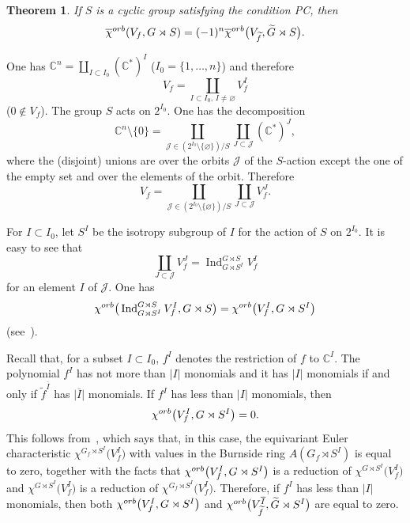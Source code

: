 \documentclass[11pt]{article}
\numberwithin{equation}{section}
\numberwithin{equation}{section}
\newtheorem{Theorem}{Theorem}[section]
\begin{document}
\begin{Theorem}\label{theo:Main} If $S$ is a cyclic group satisfying the condition PC, then
 \begin{gather}\label{eqn:Main}
 {\overline{\chi}}^{ \rm orb}(V_f,G \rtimes S)=(-1)^n {\overline{\chi}}^{ \rm orb}\big(V_{\widetilde{f}},\widetilde{G} \rtimes S\big) .
 \end{gather}
\end{Theorem}

One has ${\mathbb C}^n=\coprod_{I\subset I_0}({\mathbb C}^*)^I$ ($I_0=\{1,\dots, n\}$) and therefore
\[V_f=\coprod_{I\subset I_0,\, I\ne\varnothing} V_f^I
\]
($0\notin V_f$). The group $S$ acts on
$2^{I_0}$. One has the decomposition
\[
{\mathbb C}^n \setminus \{ 0 \} =\coprod_{{\mathcal J}\in\left(2^{I_0}\setminus\{\varnothing\}\right)/S}\coprod_{J\subset {\mathcal J}}({\mathbb C}^*)^J,
\]
where the (disjoint)
unions are over the orbits ${\mathcal J}$ of the $S$-action except the one of the empty set and over the elements of
the orbit. Therefore
\[
V_f=\coprod_{{\mathcal J}\in\left(2^{I_0}\setminus\{\varnothing\}\right)/S}\coprod_{J\subset {\mathcal J}}V_f^J.
\]

For $I\subset I_0$, let $S^I$ be the isotropy subgroup of $I$ for the action of $S$ on $2^{I_0}$. It is easy to see that
\[
\coprod_{J\subset {\mathcal J}}V_f^J=\operatorname{Ind}_{G\rtimes S^I}^{G\rtimes S} V_f^I
\]
for an element $I$ of ${\mathcal J}$. One has
\[
{\chi}^{\rm orb}\big(\operatorname{Ind}_{G\rtimes S^I}^{G\rtimes S} V_f^I, G\rtimes S\big)=
{\chi}^{\rm orb}\big(V_f^I, G\rtimes S^I\big)
\]
(see~\cite[Theorem~1]{GLM}).

Recall that, for a subset $I\subset I_0$, $f^I$ denotes the restriction of $f$ to ${\mathbb C}^I$. The polynomial $f^I$ has
not more than $\vert I\vert$ monomials and it has $\vert I\vert$ monomials if and only if
$\widetilde{f}^{\overline{I}}$ has $\vert \overline{I}\vert$ monomials. If $f^I$ has less than $\vert I\vert$
monomials, then
\[
{\chi}^{\rm orb}\big(V_f^I, G\rtimes S^I\big)=0 .
\]
This follows from~\cite[Lemma~1]{EG-IMRN}, which says that, in this case, the equivariant Euler characteristic $\chi^{G_f\rtimes S^I}\big(V_f^I\big)$ with values in the Burnside ring $A(G_f\rtimes S^I)$ is equal to zero, together with the facts that ${\chi}^{\rm orb}\big(V_f^I, G\rtimes S^I\big)$ is a reduction of $\chi^{G\rtimes S^I}\big(V_f^I\big)$ and $\chi^{G\rtimes S^I}\big(V_f^I\big)$ is a reduction of $\chi^{G_f\rtimes S^I}\big(V_f^I\big)$. Therefore, if $f^I$ has less than $\vert I\vert$ monomials, then both ${\chi}^{\rm orb}\big(V_f^I, G\rtimes S^I\big)$ and ${\chi}^{\rm orb}\big(V_{\widetilde{f}}^{\overline{I}}, \widetilde{G}\rtimes S^I\big)$ are equal to zero.
\end{document}
